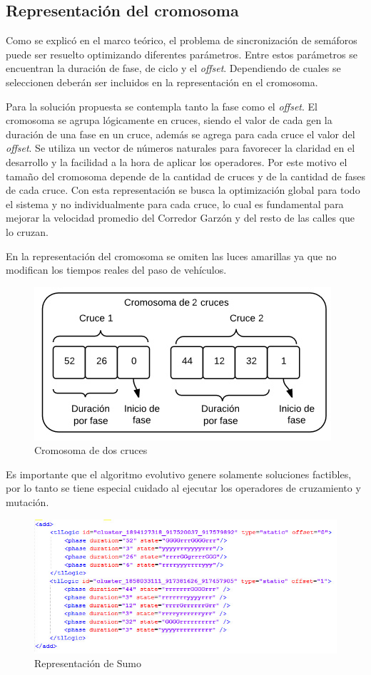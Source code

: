 \subsection{Representación del cromosoma}

Como se explicó en el marco teórico, el problema de sincronización de semáforos puede ser resuelto optimizando diferentes parámetros. Entre estos parámetros se encuentran la duración de fase, de ciclo y el \emph{offset}. Dependiendo de cuales se seleccionen deberán ser incluidos en la representación en el cromosoma.

Para la solución propuesta se contempla tanto la fase como el \emph{offset}. El cromosoma se agrupa lógicamente en cruces, siendo el valor de cada gen la duración de una
fase en un cruce, además se agrega para cada cruce el valor del \emph{offset}. Se utiliza un vector de números naturales para favorecer la claridad en el desarrollo y la facilidad a la hora de aplicar los operadores. Por este motivo el tamaño del cromosoma depende de la cantidad de cruces y de la cantidad de fases de cada cruce. Con esta representación se busca la optimización global para todo el sistema y no individualmente para cada cruce, lo cual es fundamental para mejorar la velocidad promedio del Corredor Garzón y del resto de las calles que lo cruzan.

En la representación del cromosoma se omiten las luces amarillas ya que no modifican los tiempos reales del paso de vehículos.
 
 \begin{figure}[h]
 	\centering
 	\includegraphics[width=0.7\linewidth]{Figures/cromosoma1}
 	\caption{Cromosoma de dos cruces}
 	\label{fig:cromosoma1}
 \end{figure}
 
Es importante que el algoritmo evolutivo genere solamente soluciones factibles, por lo tanto se tiene especial cuidado al ejecutar los operadores de cruzamiento y mutación.

\begin{figure}[H]
	\centering
	\includegraphics[width=\linewidth]{Figures/rep_sumo2}
	\caption{Representación de Sumo}
	\label{fig:rep_sumo}
\end{figure}

